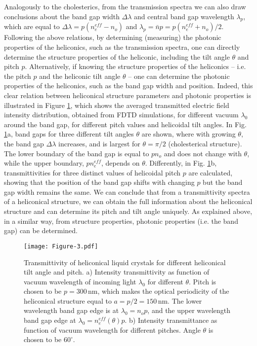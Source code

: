 \documentclass{osa-article}
\begin{document}
Analogously to the cholesterics, from the transmission spectra we can also draw conclusions about the band gap width $\Delta \lambda$ and central band gap wavelength $\lambda_p$, 
which are equal to $\Delta \lambda = p(n_e^{eff}-n_o)$ and $\lambda_p=\bar{n}p=p(n_e^{eff}+n_o)/2$. 
Following the above relations, by determining (measuring) the photonic properties of the heliconics, such as the transmission spectra, 
one can directly determine the structure properties of the heliconic, including the tilt angle $\theta$ and pitch $p$.
Alternatively, if knowing the structure properties of the heliconics -- i.e. the pitch $p$ and the heliconic tilt angle $\theta$ -- 
one can determine the photonic properties of the heliconics, such as the band gap width and position. 
Indeed, this clear relation between heliconical structure parameters and photonic properties is illustrated in Figure \ref{fig:transmittivity}, 
which shows the averaged transmitted electric field intensity distribution, obtained from FDTD simulations,
for different vacuum $\lambda_0$ around the band gap, for different pitch values and helicoidal tilt angles.
In Fig. \ref{fig:transmittivity}a, band gaps for three different tilt angles $\theta$ are shown, 
where with growing $\theta$, the band gap $\Delta \lambda$ increases, and is largest for $\theta=\pi/2$ (cholesterical structure).
The lower boundary of the band gap is equal to $p n_o$ and does not change with $\theta$, while the upper boundary, $p n_e^{eff}$, depends on $\theta$. 
Differently, in Fig. \ref{fig:transmittivity}b, transmittivities for three distinct values of helicoidal pitch $p$ are calculated, 
showing that the position of the band gap shifts with changing $p$ but the band gap width remains the same. 
We can conclude that from a transmittivity spectra of a heliconical structure, 
we can obtain the full information about the heliconical structure and can determine its pitch and tilt angle uniquely. 
As explained above, in a similar way, from structure properties, photonic properties (i.e. the band gap) can be determined. 

\begin{figure}[h!]
  \centering
  \texttt{[image: Figure-3.pdf]}
  \caption{
  Transmittivity of heliconical liquid crystals for different heliconical tilt angle and pitch. 
  a) Intensity transmittivity as function of vacuum wavelength of incoming light $\lambda_0$ for different $\theta$. 
  Pitch is chosen to be $p=300\, \mathrm{nm}$, which makes the optical periodicity of the heliconical structure equal to $a=p/2=150 \, \mathrm{nm}$.
  The lower wavelength band gap edge is at $\lambda_0=n_o p $, 
  and the upper wavelength band gap edge at $\lambda_0=n_e^{eff}(\theta) p$. 
  b) Intensity transmittance as function of vacuum wavelength for different pitches. 
  Angle $\theta$ is chosen to be $60^\circ$.
  }
  \label{fig:transmittivity}
\end{figure}
\end{document}
